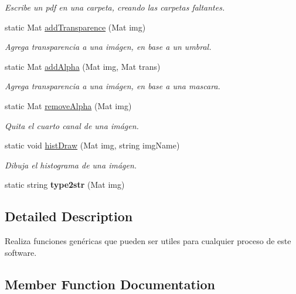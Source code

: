 \begin{DoxyCompactItemize}
\begin{DoxyCompactList}\small\item\em Escribe un pdf en una carpeta, creando las carpetas faltantes. \end{DoxyCompactList}\item 
static Mat \mbox{\hyperlink{classCommonFunctions_a66c8badc3cb8d173aaac77a3acdbec4c}{add\+Transparence}} (Mat img)
\begin{DoxyCompactList}\small\item\em Agrega transparencia a una imágen, en base a un umbral. \end{DoxyCompactList}\item 
static Mat \mbox{\hyperlink{classCommonFunctions_acede9b6245c18d795b94b7c2261671b1}{add\+Alpha}} (Mat img, Mat trans)
\begin{DoxyCompactList}\small\item\em Agrega transparencia a una imágen, en base a una mascara. \end{DoxyCompactList}\item 
static Mat \mbox{\hyperlink{classCommonFunctions_a511266d1137ccdefb6e7c5d156145831}{remove\+Alpha}} (Mat img)
\begin{DoxyCompactList}\small\item\em Quita el cuarto canal de una imágen. \end{DoxyCompactList}\item 
static void \mbox{\hyperlink{classCommonFunctions_a7b0e52ec4c30af5244724936f163c2d1}{hist\+Draw}} (Mat img, string img\+Name)
\begin{DoxyCompactList}\small\item\em Dibuja el histograma de una imágen. \end{DoxyCompactList}\item 
\mbox{\label{classCommonFunctions_a46eb03d173a7e2ec7459a49a78e40d48}} 
static string {\bfseries type2str} (Mat img)
\end{DoxyCompactItemize}


\subsection{Detailed Description}
Realiza funciones genéricas que pueden ser utiles para cualquier proceso de este software. 

\subsection{Member Function Documentation}
\mbox{\label{classCommonFunctions_acede9b6245c18d795b94b7c2261671b1}} 
